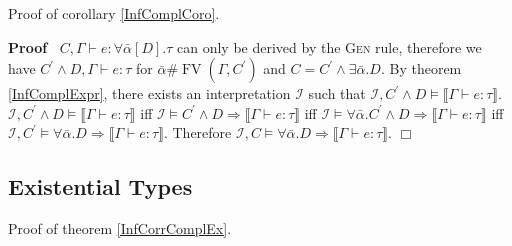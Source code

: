 \documentclass{article}
\newcommand{\tmname}[1]{\textsc{#1}}
\newcommand{\tmop}[1]{\ensuremath{\operatorname{#1}}}
\newenvironment{proof}{\noindent\textbf{Proof\ }}{\hspace*{\fill}$\Box$\medskip}
\begin{document}
Proof of corollary \ref{InfComplCoro}.

\begin{proof}
  $C, \Gamma \vdash e : \forall \bar{\alpha} [D] . \tau$ can only be derived
  by the {\tmname{Gen}} rule, therefore we have $C^{\prime} \wedge D, \Gamma
  \vdash e : \tau$ for $\bar{\alpha} \# \tmop{FV} (\Gamma, C^{\prime})$ and $C
  = C^{\prime} \wedge \exists \bar{\alpha} .D$. By theorem \ref{InfComplExpr},
  there exists an interpretation $\mathcal{I}$ such that $\mathcal{I},
  C^{\prime} \wedge D \vDash \llbracket \Gamma \vdash e : \tau \rrbracket$.
  $\mathcal{I}, C^{\prime} \wedge D \vDash \llbracket \Gamma \vdash e : \tau
  \rrbracket$ iff $\mathcal{I} \vDash C^{\prime} \wedge D \Rightarrow
  \llbracket \Gamma \vdash e : \tau \rrbracket$ iff $\mathcal{I} \vDash
  \forall \bar{\alpha} .C^{\prime} \wedge D \Rightarrow \llbracket \Gamma
  \vdash e : \tau \rrbracket$ iff $\mathcal{I}, C^{\prime} \vDash \forall
  \bar{\alpha} .D \Rightarrow \llbracket \Gamma \vdash e : \tau \rrbracket$.
  Therefore $\mathcal{I}, C \vDash \forall \bar{\alpha} .D \Rightarrow
  \llbracket \Gamma \vdash e : \tau \rrbracket$.
\end{proof}

\subsection{Existential Types}\label{ExGADTsProofs}

Proof of theorem \ref{InfCorrComplEx}.
\end{document}
